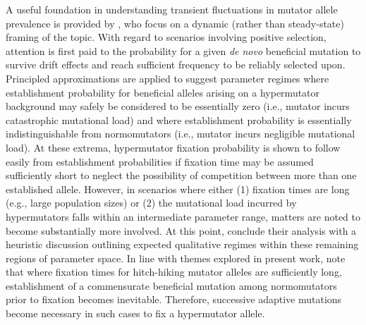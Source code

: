 A useful foundation in understanding transient fluctuations in mutator allele prevalence is provided by \citet{desai2011balance}, who focus on a dynamic (rather than steady-state) framing of the topic.
With regard to scenarios involving positive selection, attention is first paid to the probability for a given \textit{de novo} beneficial mutation to survive drift effects and reach sufficient frequency to be reliably selected upon.
Principled approximations are applied to suggest parameter regimes where establishment probability for beneficial alleles arising on a hypermutator background may safely be considered to be essentially zero (i.e., mutator incurs catastrophic mutational load) and where establishment probability is essentially indistinguishable from normomutators (i.e., mutator incurs negligible mutational load).
At these extrema, hypermutator fixation probability is shown to follow easily from establishment probabilities if fixation time may be assumed sufficiently short to neglect the possibility of competition between more than one established allele.
However, in scenarios where either (1) fixation times are long (e.g., large population sizes) or (2) the mutational load incurred by hypermutators falls within an intermediate parameter range, matters are noted to become substantially more involved.
At this point, \citet{desai2011balance} conclude their analysis with a heuristic discussion outlining expected qualitative regimes within these remaining regions of parameter space.
In line with themes explored in present work, \citet{desai2011balance} note that where fixation times for hitch-hiking mutator alleles are sufficiently long, establishment of a commensurate beneficial mutation among normomutators prior to fixation becomes inevitable.
Therefore, successive adaptive mutations become necessary in such cases to fix a hypermutator allele.

